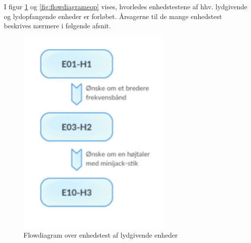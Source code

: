 I figur \ref{fig:flowdiagramelyd} og \ref{fig:flowdiagrameop} vises, hvorledes enhedstestene af hhv. lydgivende og lydopfangende enheder er forløbet. Årsagerne til de mange enhedstest beskrives nærmere i følgende afsnit.  

\begin{figure}[htb]
			\centering
				\includegraphics[width=3in]{flowdiagramelyd}
				\caption{Flowdiagram over enhedstest af lydgivende enheder}	
				\label{fig:flowdiagramelyd}
			\end{figure}

